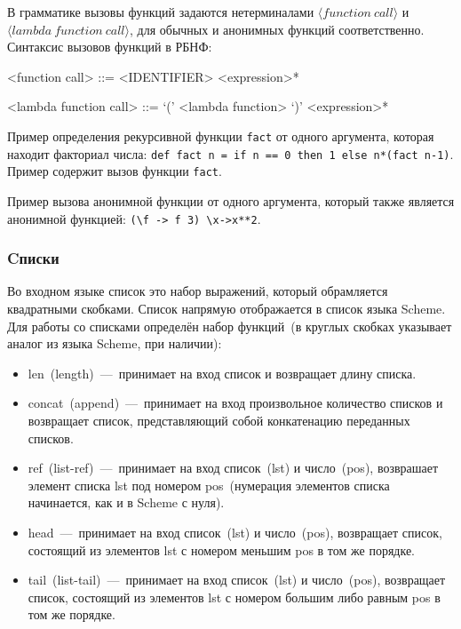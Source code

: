 \documentclass[12pt,a4paper,oneside]{extarticle}
\begin{document}
            В грамматике вызовы функций задаются нетерминалами $\langle function~call \rangle$ и $\langle lambda~function~call \rangle$, для обычных и анонимных функций соответственно. Синтаксис вызовов функций в РБНФ:

            \begin{grammar}
                <function call> ::= <IDENTIFIER> <expression>*

                <lambda function call> ::= `(' <lambda function> `)' <expression>*
            \end{grammar}

            Пример определения рекурсивной функции \lstinline$fact$ от одного аргумента, которая находит факториал числа: \lstinline$def fact n = if n == 0 then 1 else n*(fact n-1)$. Пример содержит вызов функции \lstinline$fact$.

            Пример вызова анонимной функции от одного аргумента, который также является анонимной функцией: \lstinline$(\f -> f 3) \x->x**2$.

        \subsubsection{Cписки}
            Во входном языке список это набор выражений, который обрамляется квадратными скобками.
            Список напрямую отображается в список языка Scheme.
            Для работы со списками определён набор функций~(в круглых скобках указывает аналог из языка Scheme, при наличии):
            \begin{itemize}
                \item len~(length)~---~принимает на вход список и возвращает длину списка.
                \item concat~(append)~---~принимает на вход произвольное количество списков и возвращает список, представляющий собой конкатенацию переданных списков.
                \item ref~(list-ref)~---~принимает на вход список~(lst) и число~(pos), возврашает элемент списка lst под номером pos~(нумерация элементов списка начинается, как и в Scheme с нуля).
                \item head~---~принимает на вход список~(lst) и число~(pos), возвращает список, состоящий из элементов lst с номером меньшим pos в том же порядке.
                \item tail~(list-tail)~---~принимает на вход список~(lst) и число~(pos), возвращает список, состоящий из элементов lst с номером большим либо равным pos в том же порядке.
            \end{itemize}
\end{document}
